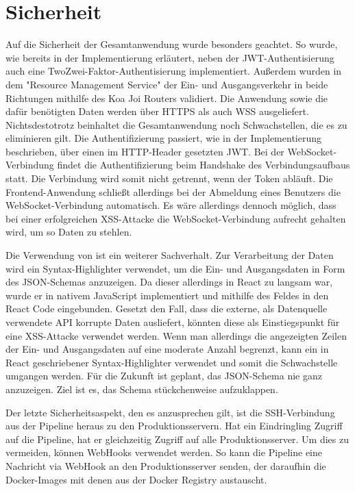 \section{Sicherheit}
\label{sec:sicherheit}
Auf die Sicherheit der Gesamtanwendung wurde besonders geachtet. So
wurde, wie bereits in der Implementierung erläutert, neben
der JWT\hyp{}Authentisierung auch eine TwoZwei\hyp{}Faktor\hyp{}Authentisierung
implementiert. Außerdem wurden in dem "Resource Management Service"
der Ein- und Ausgangsverkehr in beide Richtungen mithilfe des Koa Joi Routers validiert. Die Anwendung sowie die dafür benötigten
Daten werden über HTTPS als auch WSS ausgeliefert. \mbox{Nichtsdestotrotz} beinhaltet die Gesamtanwendung
noch Schwachstellen, die es zu eliminieren gilt. Die Authentifizierung passiert, wie in der Implementierung beschrieben,
über einen im HTTP-Header gesetzten JWT. Bei der WebSocket-Verbindung findet die Authentifizierung beim Handshake des
Verbindungsaufbaus statt. Die Verbindung wird somit nicht getrennt, wenn der Token abläuft. Die Frontend-Anwendung
schließt allerdings bei der Abmeldung eines Benutzers die WebSocket-Verbindung automatisch. Es wäre allerdings dennoch möglich,
dass bei einer erfolgreichen XSS\hyp{}Attacke die WebSocket\hyp{}Verbindung aufrecht gehalten wird, um so Daten zu stehlen.

Die Verwendung von  ist ein weiterer Sachverhalt. Zur Verarbeitung
der Daten wird ein Syntax-Highlighter verwendet, um die Ein- und
Ausgangsdaten in Form des JSON-Schemas anzuzeigen.
Da dieser allerdings in React zu langsam war, wurde er
in nativem JavaScript implementiert und mithilfe des 
 Feldes in den React Code eingebunden. Gesetzt den Fall, dass die externe,
als Datenquelle verwendete API korrupte Daten ausliefert, könnten diese als Einstiegspunkt für eine XSS-Attacke verwendet werden.
Wenn man allerdings die angezeigten Zeilen der Ein- und Ausgangsdaten auf eine moderate Anzahl begrenzt, kann ein
in React geschriebener Syntax-Highlighter verwendet und somit die Schwachstelle umgangen werden. Für die Zukunft ist geplant,
das JSON-Schema nie ganz anzuzeigen. Ziel ist es, das Schema stückchenweise aufzuklappen.

Der letzte Sicherheitsaspekt, den es anzusprechen gilt, ist die SSH-Verbindung aus der Pipeline heraus zu den Produktionsservern.
Hat ein Eindringling Zugriff auf die Pipeline, hat er gleichzeitig Zugriff auf alle Produktionsserver. 
Um dies zu vermeiden, können WebHooks verwendet werden. So kann die Pipeline eine Nachricht via WebHook an
den Produktionsserver senden, der daraufhin die Docker-Images mit denen aus der Docker Registry austauscht.

